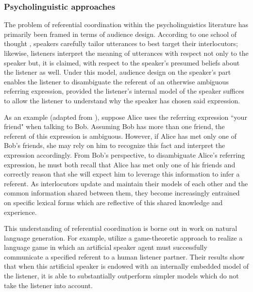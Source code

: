 \documentclass[11pt]{article}
\begin{document}
\subsubsection{Psycholinguistic approaches}
The problem of referential coordination within the psycholinguistics literature has primarily been framed in terms of audience design. According to one school of thought \citep{clark1982}, speakers carefully tailor utterances to best target their interlocutors; likewise, listeners interpret the meaning of utterances with respect not only to the speaker but, it is claimed, with respect to the speaker's presumed beliefs about the listener as well. Under this model, audience design on the speaker's part enables the listener to disambiguate the referent of an otherwise ambiguous referring expression, provided the listener's internal model of the speaker suffices to allow the listener to understand why the speaker has chosen said expression. 

As an example (adapted from \citeauthor{clark1982}), suppose Alice uses the referring expression ``your friend" when talking to Bob. Assuming Bob has more than one friend, the referent of this expression is ambiguous. However, if Alice has met only one of Bob's friends, she may rely on him to recognize this fact and interpret the expression accordingly. From Bob's perspective, to disambiguate Alice's referring expression, he must both recall that Alice has met only one of his friends and correctly reason that she will expect him to leverage this information to infer a referent. As interlocutors update and maintain their models of each other and the common information shared between them, they become increasingly entrained on specific lexical forms which are reflective of this shared knowledge and experience.

This understanding of referential coordination is borne out in work on natural language generation. For example, \cite{golland2010} utilize a game-theoretic approach to realize a language game in which an artificial speaker agent must successfully communicate a specified referent to a human listener partner. Their results show that when this artificial speaker is endowed with an internally embedded model of the listener, it is able to substantially outperform simpler models which do not take the listener into account.
\end{document}
